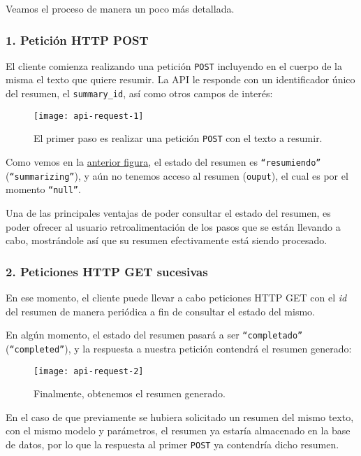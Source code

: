 Veamos el proceso de manera un poco más detallada.

\subsubsection{1. Petición HTTP POST}

El cliente comienza realizando una petición \texttt{POST} incluyendo en el cuerpo de la misma el texto que quiere resumir. La API le responde con un identificador único del resumen, el \texttt{summary\_id}, así como otros campos de interés:

\begin{figure}[h]
	\centering
	\texttt{[image: api-request-1]}
	\caption[Primer paso: realizar una petición POST.]{El primer paso es realizar una petición \texttt{POST} con el texto a resumir.}
	\label{fig:api-primer-paso}
\end{figure}

Como vemos en la \hyperref[fig:api-primer-paso]{anterior figura}, el estado del resumen es \texttt{``resumiendo''} (\texttt{``summarizing''}), y aún no tenemos acceso al resumen (\texttt{ouput}), el cual es por el momento \texttt{``null''}.

Una de las principales ventajas de poder consultar el estado del resumen, es poder ofrecer al usuario retroalimentación de los pasos que se están llevando a cabo, mostrándole así que su resumen efectivamente está siendo procesado.

\subsubsection{2. Peticiones HTTP GET sucesivas}

En ese momento, el cliente puede llevar a cabo peticiones HTTP GET con el \emph{id} del resumen de manera periódica a fin de consultar el estado del mismo.

En algún momento, el estado del resumen pasará a ser \texttt{``completado''} (\texttt{``completed''}), y la respuesta a nuestra petición contendrá el resumen generado:

\begin{figure}[h]
	\centering
	\texttt{[image: api-request-2]}
	\caption{Finalmente, obtenemos el resumen generado.}
\end{figure}

En el caso de que previamente se hubiera solicitado un resumen del mismo texto, con el mismo modelo y parámetros, el resumen ya estaría almacenado en la base de datos, por lo que la respuesta al primer \texttt{POST} ya contendría dicho resumen.


